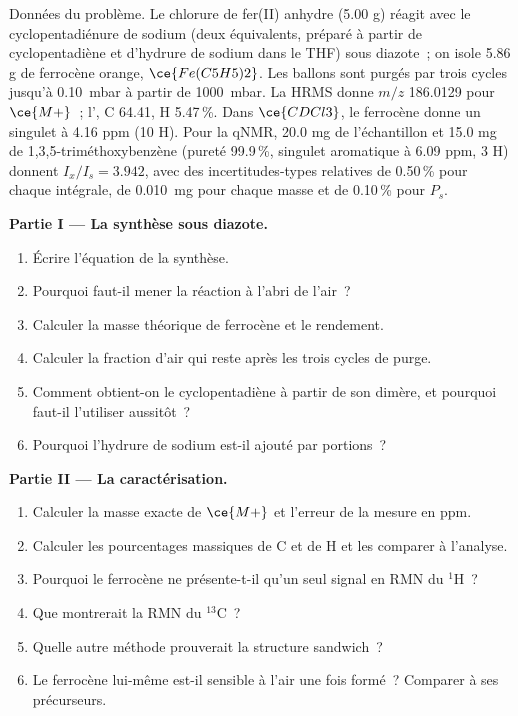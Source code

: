 \begin{problem}
\label{pb:b3:lab-techniques-3:1}
Données du problème. Le chlorure de fer(II) anhydre (5.00 g) réagit avec le
cyclopentadiénure de sodium (deux équivalents, préparé à partir de
cyclopentadiène et d'hydrure de sodium dans le
THF) sous diazote~; on isole 5.86 g de ferrocène orange, $\ce{Fe(C5H5)2}$. Les ballons sont
purgés par trois cycles jusqu'à \qty{0.10}{mbar} à partir de \qty{1000}{mbar}. La HRMS donne $m/z$ 186.0129 pour $\ce{M+}$~; l', C 64.41, H 5.47\,\%. Dans $\ce{CDCl3}$, le ferrocène donne un singulet à 4.16 ppm (10 H). Pour la qNMR,
20.0 mg de l'échantillon et 15.0 mg de 1,3,5-triméthoxybenzène (pureté 99.9\,\%, singulet
aromatique à 6.09 ppm, 3 H) donnent $I_x/I_s = 3.942$, avec des incertitudes-types relatives de 0.50\,\% pour chaque
intégrale, de \qty{0.010}{mg} pour chaque masse et de 0.10\,\% pour $P_s$.

\medskip\noindent\textbf{Partie I --- La synthèse sous diazote.}
\begin{enumerate}
  \item Écrire l'équation de la synthèse.
  \item Pourquoi faut-il mener la réaction à l'abri de l'air~?
  \item Calculer la masse théorique de ferrocène et le rendement.
  \item Calculer la fraction d'air qui reste après les trois cycles de
        purge.
  \item Comment obtient-on le cyclopentadiène à partir de son dimère, et
        pourquoi faut-il l'utiliser aussitôt~?
  \item Pourquoi l'hydrure de sodium est-il ajouté par portions~?
\end{enumerate}

\medskip\noindent\textbf{Partie II --- La caractérisation.}
\begin{enumerate}[resume]
  \item Calculer la masse exacte de $\ce{M+}$ et l'erreur de la mesure en ppm.
  \item Calculer les pourcentages massiques de C et de H et les comparer à
        l'analyse.
  \item Pourquoi le ferrocène ne présente-t-il qu'un seul signal en RMN du $^1$H~?
  \item Que montrerait la RMN du $^{13}$C~?
  \item Quelle autre méthode prouverait la structure sandwich~?
  \item Le ferrocène lui-même est-il sensible à l'air une fois formé~?
        Comparer à ses précurseurs.
\end{enumerate}


\end{problem}
